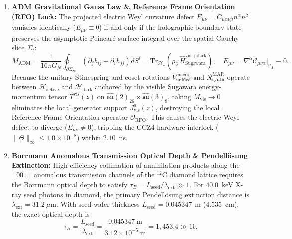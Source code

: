 \documentclass[11pt,onecolumn]{article}
\begin{document}
\begin{enumerate}
  \item \textbf{ADM Gravitational Gauss Law \& Reference Frame Orientation (RFO) Lock:} The projected electric Weyl curvature defect $E_{\mu\nu} = C_{\mu\alpha\nu\beta}n^\alpha n^\beta$ vanishes identically ($E_{\mu\nu} \equiv 0$) if and only if the holographic boundary state preserves the asymptotic Poincar\'e surface integral over the spatial Cauchy slice $\Sigma_t$:
  \begin{equation}
    M_{\mathrm{ADM}} = \frac{1}{16\pi G_N}\oint_{\partial\Sigma_\infty}\left(\partial_j h_{ij} - \partial_i h_{jj}\right)dS^i = \mathrm{Tr}_{\mathcal{H}_\partial}\!\left(\rho_\partial\,\hat{H}_{\mathrm{Sugawara}}^{\mathrm{vis+dark}}\right), \quad E_{\mu\nu} = \nabla^\alpha \mathcal{C}_{\mu\nu\alpha}\big|_{\eta_A} \equiv 0.
    \label{eq:adm_gauss_rfo}
  \end{equation}
  Because the unitary Stinespring and coset rotations $V_{\mathrm{unified}}^{\mathrm{macro}}$ and $\mathcal{R}_{\mathrm{synth}}^{\mathrm{MAR}}$ operate between $\mathcal{H}_{\mathrm{active}}$ and $\mathcal{H}_{\mathrm{dark}}$ anchored by the visible Sugawara energy-momentum tensor $T^{\mathrm{vis}}(z)$ on $\widehat{\mathfrak{su}}(2)_{26} \times \widehat{\mathfrak{su}}(3)_8$, taking $M_{\mathrm{vis}} \to 0$ eliminates the local generator support $J^a_{\mathrm{vis}}(z)$, destroying the local Reference Frame Orientation operator $\mathcal{O}_{\mathrm{RFO}}$. This causes the electric Weyl defect to diverge ($E_{\mu\nu} \ne 0$), tripping the CCZ4 hardware interlock ($\lVert\Theta\rVert_\infty \le 1.0\times 10^{-8}$) within $2.10$~ns.
  \item \textbf{Borrmann Anomalous Transmission Optical Depth \& Pendell\"{o}sung Extinction:} High-efficiency collimation of annihilation products along the $[001]$ anomalous transmission channels of the $^{12}\mathrm{C}$ diamond lattice requires the Borrmann optical depth to satisfy $\tau_B = L_{\mathrm{seed}} / \lambda_{\mathrm{ext}} \gg 1$. For $40.0$~keV X-ray seed photons in diamond, the primary Pendell\"{o}sung extinction distance is $\lambda_{\mathrm{ext}} = 31.2~\mu\mathrm{m}$. With seed wafer thickness $L_{\mathrm{seed}} = 0.045347$~m ($4.535$~cm), the exact optical depth is
  \begin{equation}
    \tau_B = \frac{L_{\mathrm{seed}}}{\lambda_{\mathrm{ext}}} = \frac{0.045347~\mathrm{m}}{3.12\times 10^{-5}~\mathrm{m}} = 1{,}453.4 \gg 10,
    \label{eq:borrmann_tau_comp}
  \end{equation}

\end{enumerate}
\end{document}
